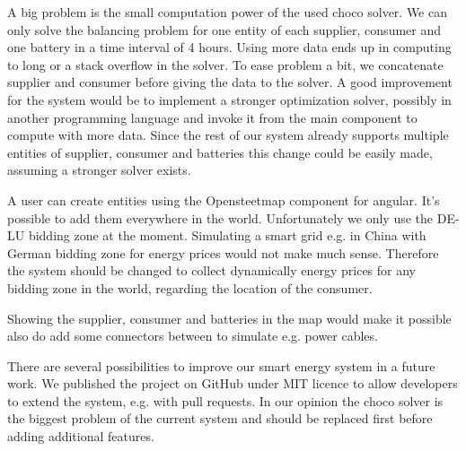 A big problem is the small computation power of the used choco solver.
We can only solve the balancing problem for one entity of each supplier, consumer and one battery in a time interval of 4 hours.
Using more data ends up in computing to long or a stack overflow in the solver.
To ease problem a bit, we concatenate supplier and consumer before giving the data to the solver.
A good improvement for the system would be to implement a stronger optimization solver, possibly in another programming language and invoke it from the main component to compute with more data.
Since the rest of our system already supports multiple entities of supplier, consumer and batteries this change could be easily made, assuming a stronger solver exists.

A user can create entities using the Opensteetmap component for angular.
It's possible to add them everywhere in the world.
Unfortunately we only use the DE-LU bidding zone at the moment.
Simulating a smart grid e.g. in China with German bidding zone for energy prices would not make much sense.
Therefore the system should be changed to collect dynamically energy prices for any bidding zone in the world, regarding the location of the consumer.

Showing the supplier, consumer and batteries in the map would make it possible also do add some connectors between to simulate e.g. power cables.

There are several possibilities to improve our smart energy system in a future work.
We published the project on GitHub under MIT licence to allow developers to extend the system, e.g. with pull requests.
In our opinion the choco solver is the biggest problem of the current system and should be replaced first before adding additional features.